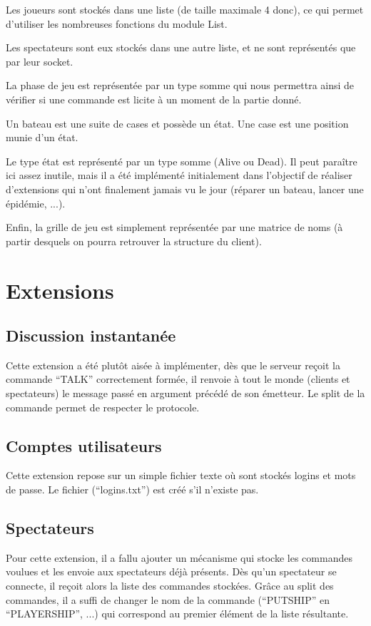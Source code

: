 \documentclass[a4paper, 11pt]{report}
\begin{document}
Les joueurs sont stockés dans une liste (de taille maximale 4 donc), ce qui permet d'utiliser les nombreuses fonctions du module List.

Les spectateurs sont eux stockés dans une autre liste, et ne sont représentés que par leur socket.

La phase de jeu est représentée par un type somme qui nous permettra ainsi de vérifier si une commande est licite à un moment de la partie donné.

Un bateau est une suite de cases et possède un état.
Une case est une position munie d'un état.

Le type état est représenté par un type somme (Alive ou Dead). Il peut paraître ici assez inutile, mais il a été implémenté initialement dans l'objectif de réaliser d'extensions qui n'ont finalement jamais vu le jour (réparer un bateau, lancer une épidémie, ...).

Enfin, la grille de jeu est simplement représentée par une matrice de noms (à partir desquels on pourra retrouver la structure du client).

\section{Extensions}

\subsection{Discussion instantanée}

Cette extension a été plutôt aisée à implémenter, dès que le serveur reçoit la commande ``TALK'' correctement formée, il renvoie à tout le monde (clients et spectateurs) le message passé en argument précédé de son émetteur. Le split de la commande permet de respecter le protocole.

\subsection{Comptes utilisateurs}

Cette extension repose sur un simple fichier texte où sont stockés logins et mots de passe. Le fichier (``logins.txt'') est créé s'il n'existe pas.

\subsection{Spectateurs}

Pour cette extension, il a fallu ajouter un mécanisme qui stocke les commandes voulues et les envoie aux spectateurs déjà présents. Dès qu'un spectateur se connecte, il reçoit alors la liste des commandes stockées. Grâce au split des commandes, il a suffi de changer le nom de la commande (``PUTSHIP'' en ``PLAYERSHIP'', ...) qui correspond au premier élément de la liste résultante.
\end{document}

